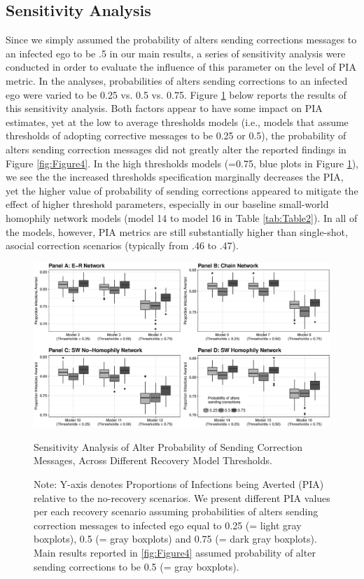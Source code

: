\documentclass[man, 12pt, a4paper, nolmodern, noextraspace]{apa6}
\begin{document}
\subsection{Sensitivity Analysis}
  Since we simply assumed the probability of alters sending corrections messages to an infected ego to be .5 in our main results, a series of sensitivity analysis were conducted in order to evaluate the influence of this parameter on the level of PIA metric. In the analyses, probabilities of alters sending corrections to an infected ego were varied to be 0.25 vs. 0.5 vs. 0.75. Figure \ref{fig:Figure5} below reports the results of this sensitivity analysis. Both factors appear to have some impact on PIA estimates, yet at the low to average thresholds models (i.e., models that assume thresholds of adopting corrective messages to be 0.25 or 0.5), the probability of alters sending correction messages did not greatly alter the reported findings in Figure \ref{fig:Figure4}. In the high thresholds models (=0.75, blue plots in Figure \ref{fig:Figure5}), we see the the increased thresholds specification marginally decreases the PIA, yet the higher value of probability of sending corrections appeared to mitigate the effect of higher threshold parameters, especially in our baseline small-world homophily network models (model 14 to model 16 in Table \ref{tab:Table2}). In all of the models, however, PIA metrics are still substantially higher than single-shot, asocial correction scenarios (typically from .46 to .47).     
    
\begin{figure}
    \centering
        \includegraphics[clip, width=0.9\linewidth, height=0.55\textwidth]{draft/Fig5.eps} 

    \captionsetup{format=hang}
    \caption{Sensitivity Analysis of Alter Probability of Sending Correction Messages, Across Different Recovery Model Thresholds.} 
    \label{fig:Figure5}
    \captionsetup{font=small}
    \caption*{Note: Y-axis denotes Proportions of Infections being Averted (PIA) relative to the no-recovery scenarios. We present different PIA values per each recovery scenario assuming probabilities of alters sending correction messages to infected ego equal to 0.25 (= light gray boxplots), 0.5 (= gray boxplots) and 0.75 (= dark gray boxplots). Main results reported in \ref{fig:Figure4} assumed probability of alter sending corrections to be 0.5 (= gray boxplots).} 
\end{figure}       
  
\end{document}
